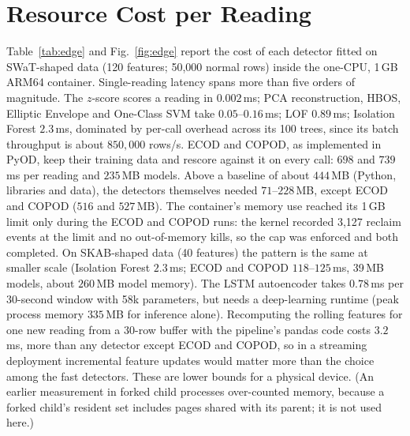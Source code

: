 \documentclass[11pt]{article}
\begin{document}
\section{Resource Cost per Reading}
\label{sec:edge}

Table~\ref{tab:edge} and Fig.~\ref{fig:edge} report the cost of each detector
fitted on SWaT-shaped data (120 features; 50{,}000 normal rows) inside the
one-CPU, 1\,GB ARM64 container. Single-reading latency spans more than five orders of
magnitude. The $z$-score scores a reading in $0.002$\,ms; PCA reconstruction, HBOS,
Elliptic Envelope and One-Class SVM take $0.05$--$0.16$\,ms; LOF $0.89$\,ms;
Isolation Forest $2.3$\,ms, dominated by per-call overhead across its 100 trees,
since its batch throughput is about $850{,}000$ rows/s. ECOD and COPOD, as
implemented in PyOD, keep their training data and rescore against it on every
call: $698$ and $739$\,ms per reading and $235$\,MB models. Above a baseline of
about $444$\,MB (Python, libraries and data), the detectors themselves needed
$71$--$228$\,MB, except ECOD and COPOD ($516$ and $527$\,MB). The container's memory
use reached its 1\,GB limit only during the ECOD and COPOD runs: the kernel recorded
3{,}127 reclaim events at the limit and no out-of-memory kills, so the cap was
enforced and both completed. On SKAB-shaped data (40 features) the pattern is the
same at smaller scale (Isolation Forest $2.3$\,ms; ECOD and COPOD $118$--$125$\,ms,
39\,MB models, about $260$\,MB model memory). The LSTM autoencoder takes $0.78$\,ms
per 30-second window with 58k parameters, but needs a deep-learning runtime (peak
process memory $335$\,MB for inference alone). Recomputing the rolling features for
one new reading from a 30-row buffer with the pipeline's pandas code costs
$3.2$\,ms, more than any detector except ECOD and COPOD, so in a streaming
deployment incremental feature updates would matter more than the choice among the
fast detectors. These are lower bounds for a physical device. (An earlier
measurement in forked child processes over-counted memory, because a forked child's
resident set includes pages shared with its parent; it is not used here.)
\end{document}
